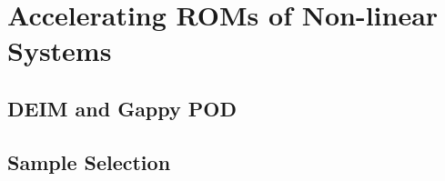 \section{Accelerating ROMs of Non-linear Systems}\label{sec:hyperreduction}

\subsection{DEIM and Gappy POD}

\subsection{Sample Selection}